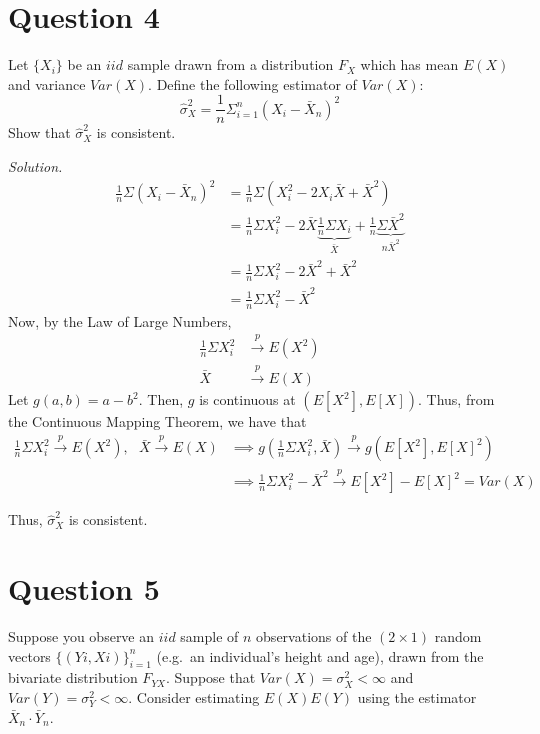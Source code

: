 \documentclass[
]{article}
\begin{document}
\hypertarget{question-4}{%
\section{Question 4}\label{question-4}}

Let \(\{X_i\}\) be an \(iid\) sample drawn from a distribution \(F_X\)
which has mean \(E(X)\) and variance \(Var (X)\). Define the following
estimator of \(Var (X)\):
\[\hat{\sigma}^2_X = \frac{1}{n} \Sigma^n_{i=1}(X_i-\bar{X}_n)^2 \] Show
that \(\hat{\sigma}^2_X\) is consistent.

\textit{Solution.} \[\begin{aligned}
\frac{1}{n}\Sigma (X_i-\bar{X}_n)^2 &= \frac{1}{n}\Sigma (X_i ^2 - 2 X_i \bar{X} + \bar{X} ^2) \\
&= \frac{1}{n}\Sigma X_i^2 - 2\bar{X}\underbrace{\frac{1}{n}\Sigma X_i}_{\bar{X}} + \frac{1}{n} \underbrace{\Sigma \bar{X}^2}_{n\bar{X}^2} \\
&= \frac{1}{n}\Sigma X_i^2 - 2 \bar{X}^2 + \bar{X}^2 \\
&= \frac{1}{n}\Sigma X_i^2 - \bar{X}^2
\end{aligned}\] Now, by the Law of Large Numbers, \[\begin{aligned}
 \frac{1}{n}\Sigma X_i^2 &\stackrel{p}{\to} E(X^2) \\
 \bar{X} &\stackrel{p}{\to} E(X)
\end{aligned}\] Let \(g(a, b) = a - b^2\). Then, \(g\) is continuous at
\((E[X^2], E[X])\). Thus, from the Continuous Mapping Theorem, we have
that \[\begin{aligned} 
\frac{1}{n} \Sigma X_i^2 \stackrel{p}{\to} E(X^2), \text{ }  \bar{X} \stackrel{p}{\to} E(X) &\implies g(\frac{1}{n} \Sigma X_i^2, \bar{X}) \stackrel{p}{\to} g(E[X^2], E[X]^2) \\
&\implies \frac{1}{n}\Sigma X_i^2 - \bar{X}^2 \stackrel{p}{\to} E[X^2]  -E[X]^2 = Var(X)
\end{aligned}\]

Thus, \(\hat{\sigma}^2_X\) is consistent.

\hypertarget{question-5}{%
\section{Question 5}\label{question-5}}

Suppose you observe an \(iid\) sample of \(n\) observations of the
\((2 × 1)\) random vectors \(\{(Yi, Xi)\}^n_{i=1}\) (e.g.~an
individual's height and age), drawn from the bivariate distribution
\(F_{YX}\). Suppose that \(Var(X) = \sigma^2_X < \infty\) and
\(Var(Y) = \sigma^2_Y < \infty\). Consider estimating \(E(X)E(Y)\) using
the estimator \(\bar{X}_n\cdot \bar{Y}_n\).
\end{document}

